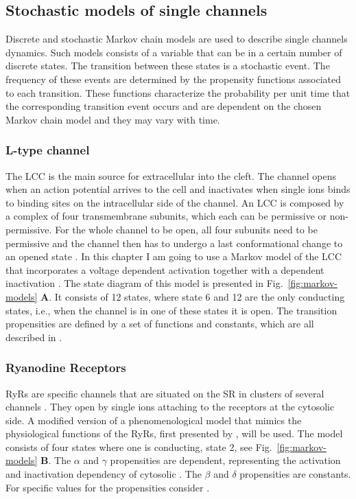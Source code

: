 \subsection{Stochastic models of single channels}
\label{sec:stochastic-models}
Discrete and stochastic Markov chain models are used to describe single channels dynamics. Such models consists of a variable that can be in a certain number of discrete states. The transition between these states is a stochastic event. The frequency of these events are determined by the propensity functions associated to each transition. These functions characterize the probability per unit time that the corresponding transition event occurs and are dependent on the chosen Markov chain model and they may vary with time.\par

\subsubsection{L-type \Ca channel}
\label{sec:lcc}
The LCC is the main source for extracellular \Ca into the cleft. The channel opens when an action potential arrives to the cell and inactivates when single \Ca ions binds to binding sites on the intracellular side of the channel. An LCC is composed by a complex of four transmembrane subunits, which each can be permissive or non-permissive. For the whole channel to be open, all four subunits need to be permissive and the channel then has to undergo a last conformational change to an opened state \cite{Hill_2001_book}. In this chapter I am going to use a Markov model of the LCC that incorporates a voltage dependent activation together with a \Ca dependent inactivation \cite{Jafr_1998_1149,Gree_2002_2918}. The state diagram of this model is presented in Fig.~\ref{fig:markov-models} \textbf{A}. It consists of 12 states, where state 6 and 12 are the only conducting states, i.e., when the channel is in one of these states it is open. The transition propensities are defined by a set of functions and constants, which are all described in \cite{Gree_2002_2918}.\par

\subsubsection{Ryanodine Receptors}
\label{sec:ryr}
RyRs are \Ca specific channels that are situated on the SR in clusters of several channels \cite{Beuc_1988_233,Fran_1999_1528}. They open by single \Ca ions attaching to the receptors at the cytosolic side. A modified version of a phenomenological model that mimics the physiological functions of the RyRs, first presented by \cite{Ster_1999_469}, will be used. The model consists of four states where one is conducting, state 2, see Fig.~\ref{fig:markov-models} \textbf{B}. The $\alpha$ and $\gamma$ propensities are \Ca dependent, representing the activation and inactivation dependency of cytosolic \CaC. The $\beta$ and $\delta$ propensities are constants. For specific values for the propensities consider \cite{Ster_1999_469}.\par

